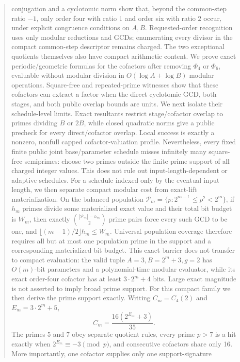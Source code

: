 \documentclass[11pt]{article}
\begin{document}
\begin{abstract}
conjugation and a cyclotomic norm show that, beyond the common-step ratio
\(-1\), only order four with ratio \(1\) and order six with ratio \(2\)
occur, under explicit congruence conditions on \(A,B\). Requested-order
recognition uses only modular reductions and GCDs; enumerating every divisor
in the compact common-step descriptor remains charged.
The two exceptional quotients themselves also have compact arithmetic
content. We prove exact periodic/geometric formulas for the cofactors after
removing \(\Phi_4\) or \(\Phi_6\), evaluable without modular division in
\(O(\log A+\log B)\) modular operations. Square-free and repeated-prime
witnesses show that these cofactors can extract a factor when the direct
cyclotomic GCD, both stages, and both public overlap bounds are units.
We next isolate their schedule-level limits. Exact resultants restrict
stage/cofactor overlap to primes dividing \(B\) or \(2B\), while closed
quadratic norms give a public precheck for every direct/cofactor overlap.
Local success is exactly a nonzero, nonfull capped cofactor-valuation profile.
Nevertheless, every fixed finite public joint base/parameter schedule misses
infinitely many square-free semiprimes: choose two primes outside the finite
prime support of all charged integer values. This does not rule out
input-length-dependent or adaptive schedules.
For a schedule indexed only by the eventual input length, we then separate
compact modular cost from exact-lift materialization. On the balanced
population
\(\mathcal P_m=\{p:2^{m-1}\le p^2<2^m\}\), if \(h_m\) primes divide some
materialized exact value and their total bit budget is \(W_m\), then exactly
\(\binom{|\mathcal P_m|-h_m}{2}\) prime pairs force every such GCD to be one,
and \(\lfloor(m-1)/2\rfloor h_m\le W_m\). Universal population coverage
therefore requires all but at most one population prime in the support and
a corresponding materialized bit budget. This exact barrier does not transfer
to compact evaluation: the valid tuple
\(A=3,B=2^m+3,g=2\) has \(O(m)\)-bit parameters and a polynomial-time modular
evaluator, while its exact order-four cofactor has at least
\(3\cdot2^m+4\) bits. Large exact magnitude is not asserted to imply broad
prime support.
For this compact family we then derive the prime support exactly. Writing
\(C_m=C_4(2)\) and \(E_m=3\cdot2^m+5\),
\[
C_m=\frac{16(2^{E_m}+3)}{35}.
\]
The primes 5 and 7 obey separate quotient rules, every prime \(p>7\) is a
hit exactly when \(2^{E_m}\equiv-3\pmod p\), and consecutive cofactors share
only 16. More importantly, one cofactor supplies only one support-signature

\end{abstract}
\end{document}
